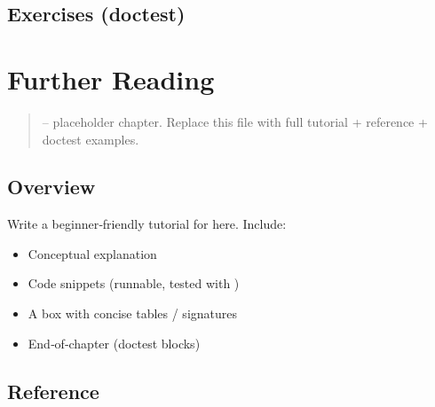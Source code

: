 \documentclass[a4paper,11pt,english]{sphinxmanual}
\begin{document}
\subsection{Exercises (doctest)}
\label{\detokenize{appendices/cheatsheets:exercises-doctest}}
\begin{sphinxVerbatim}[commandchars=\\\{\}]
\end{sphinxVerbatim}

\sphinxstepscope


\section{Further Reading}
\label{\detokenize{appendices/further_reading:further-reading}}\label{\detokenize{appendices/further_reading::doc}}\begin{quote}

\sphinxAtStartPar
{} – placeholder chapter. Replace this file with full tutorial + reference + doctest examples.
\end{quote}


\subsection{Overview}
\label{\detokenize{appendices/further_reading:overview}}
\sphinxAtStartPar
Write a beginner‑friendly tutorial for  here. Include:
\begin{itemize}
\item {} 
\sphinxAtStartPar
Conceptual explanation

\item {} 
\sphinxAtStartPar
Code snippets (runnable, tested with )

\item {} 
\sphinxAtStartPar
A  box with concise tables / signatures

\item {} 
\sphinxAtStartPar
End‑of‑chapter  (doctest blocks)

\end{itemize}


\subsection{Reference}
\label{\detokenize{appendices/further_reading:reference}}
\end{document}
